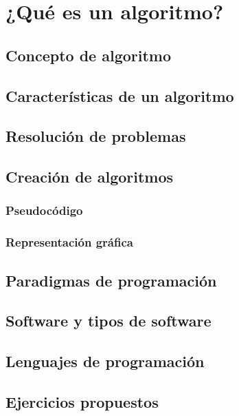 
\chapter{¿Qué es un algoritmo?}

\section{Concepto de algoritmo}

\section{Características de un algoritmo}

\section{Resolución de problemas}

\section{Creación de algoritmos}

\subsection{Pseudocódigo}

\subsection{Representación gráfica}

\section{Paradigmas de programación}

\section{Software y tipos de software}

\section{Lenguajes de programación}

\section{Ejercicios propuestos}
